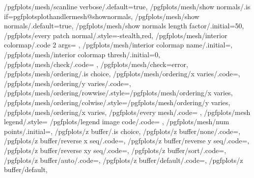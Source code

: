 {	/pgfplots/mesh/scanline verbose/.default=true,
	/pgfplots/mesh/show normals/.is if=pgfplotsplothandlermesh@shownormals,
	/pgfplots/mesh/show normals/.default=true,
	/pgfplots/mesh/show normals length factor/.initial=50,
	/pgfplots/every patch normal/.style={-stealth,red},
	/pgfplots/mesh/interior colormap/.code 2 args={%
	},
	/pgfplots/mesh/interior colormap name/.initial=,
	/pgfplots/mesh/interior colormap thresh/.initial=0,
	/pgfplots/mesh/check/.code={%
	},%
	/pgfplots/mesh/check=error,
	/pgfplots/mesh/ordering/.is choice,
	/pgfplots/mesh/ordering/x varies/.code={\def\pgfplots@plot@mesh@ordering{0}},
	/pgfplots/mesh/ordering/y varies/.code={\def\pgfplots@plot@mesh@ordering{1}},
	/pgfplots/mesh/ordering/rowwise/.style={/pgfplots/mesh/ordering/x varies},
	/pgfplots/mesh/ordering/colwise/.style={/pgfplots/mesh/ordering/y varies},
	/pgfplots/mesh/ordering/x varies,
	/pgfplots/every mesh/.code={%
	},%
	/pgfplots/mesh legend/.style={%
		/pgfplots/legend image code/.code={%
		}%
	},
	/pgfplots/mesh/num points/.initial=,%
	/pgfplots/z buffer/.is choice,%
	/pgfplots/z buffer/none/.code={\def\pgfplotsplothandlermesh@zbuffer@choice{0}},%
	/pgfplots/z buffer/reverse x seq/.code={\def\pgfplotsplothandlermesh@zbuffer@choice{1}},%
	/pgfplots/z buffer/reverse y seq/.code={\def\pgfplotsplothandlermesh@zbuffer@choice{2}},%
	/pgfplots/z buffer/reverse xy seq/.code={\def\pgfplotsplothandlermesh@zbuffer@choice{3}},%
	/pgfplots/z buffer/sort/.code={\def\pgfplotsplothandlermesh@zbuffer@choice{4}},%
	/pgfplots/z buffer/auto/.code={\def\pgfplotsplothandlermesh@zbuffer@choice{5}},%
	/pgfplots/z buffer/default/.code={\def\pgfplotsplothandlermesh@zbuffer@choice{6}},%
	/pgfplots/z buffer/default,%
}
